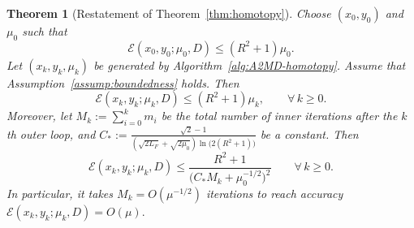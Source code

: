 \documentclass{article}
\theoremstyle{plain}
\newtheorem{theorem}{Theorem}
\theoremstyle{remark}
\begin{document}
\begin{theorem}[Restatement of Theorem~\ref{thm:homotopy}] %
Choose $(x_0,y_0)$ and $\mu_0$ such that
$$
\mathcal E(x_0,y_0;\mu_0,D)\le (R^2+1)\mu_0.
$$
Let $(x_k,y_k,\mu_k)$ be generated by Algorithm~\ref{alg:A2MD-homotopy}. Assume that Assumption~\ref{assump:boundedness} holds. Then
\begin{equation}%
\mathcal E(x_k,y_k;\mu_k,D)\le (R^2+1)\mu_k,
\qquad\forall\,k\ge 0.
\end{equation}
Moreover, let
$
M_k:=\sum_{i=0}^k m_i
$
be the total number of inner iterations after the $k$th outer loop, and
$
C_*:=\frac{\sqrt{2}-1}{(\sqrt{2L_F}+\sqrt{2\mu_0})\ln\bigl(2(R^2+1)\bigr)}
$
be a constant. Then
\begin{equation}\label{eq:rate}
\mathcal E(x_k,y_k;\mu_k,D)\le \frac{R^2+1}{\bigl(C_*M_k+\mu_0^{-1/2}\bigr)^2}
\qquad\forall\,k\ge 0.
\end{equation}
In particular, it takes $M_k=O(\mu^{-1/2})$ iterations to reach accuracy
$
\mathcal E(x_k,y_k;\mu_k,D)=O(\mu).
$
\end{theorem}
\end{document}
